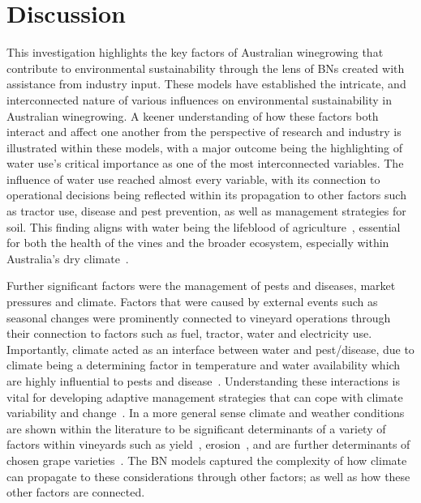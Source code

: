 
\section{Discussion}

This investigation highlights the key factors of Australian winegrowing that contribute to  environmental sustainability through the lens of BNs created with assistance from industry input. These models have established the intricate, and interconnected nature of various influences on environmental sustainability in Australian winegrowing. A keener understanding of how these factors both interact and affect one another from the perspective of research and industry is illustrated within these models, with a major outcome being the highlighting of water use's critical importance as one of the most interconnected variables. The influence of water use reached almost every variable, with its connection to operational decisions being reflected within its propagation to other factors such as tractor use, disease and pest prevention, as well as management strategies for soil. This finding aligns with water being the lifeblood of agriculture~\cite{chawlaWaterProductivityAgriculture2023}, essential for both the health of the vines and the broader ecosystem, especially within Australia's dry climate~\cite{australianbureauofstatisticsWaterUseAustralian2021}.

Further significant factors were the management of pests and diseases, market pressures and climate. Factors that were caused by external events such as seasonal changes were prominently connected to vineyard operations through their connection to factors such as fuel, tractor, water and electricity use. Importantly, climate acted as an interface between water and pest/disease, due to climate being a determining factor in temperature and water availability which are highly influential to pests and disease~\cite{boisClimateVsGrapevine2017}. Understanding these interactions is vital for developing adaptive management strategies that can cope with climate variability and change~\cite{agostaRegionalClimateVariability2012,alsafadiFutureScenariosBioclimatic2023,barriguinhaVineyardYieldEstimation2021,sharmaChapterImpactClimate2014}. In a more general sense climate and weather conditions are shown within the literature to be significant determinants of a variety of factors within vineyards such as yield~\cite{barriguinhaVineyardYieldEstimation2021,antonComparativeStudyRisk2012}, erosion~\cite{biddoccuEvaluationSoilErosion2020,doi:10.1177/0309133319861833}, and are further determinants of chosen grape varieties~\cite{topferGrapeVarietiesAre2022, petriashviliImpactClimateChange2023}. The BN models captured the complexity of how climate can propagate to these considerations through other factors; as well as how these other factors are connected.

